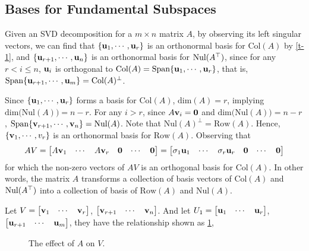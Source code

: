 \subsection{Bases for Fundamental Subspaces}
Given an SVD decomposition for a $m\times n$ matrix $A$, by observing its left singular vectors, we can find that $\{\mathbf{u}_1, \cdots, \mathbf{u}_r \}$ is an orthonormal basis for $\text{Col}(A)$ by \cref{t-1}, and $\{\mathbf{u}_{r+1}, \cdots, \mathbf{u}_n\}$ is an orthonormal basis for $\text{Nul}(A^{\top})$, since for any $r< i\leq n$, $\mathbf{u}_i$ is orthogonal to $\text{Col}(A) = \text{Span}\{\mathbf{u}_1, \cdots, \mathbf{u}_{r} \}$, that is, $\text{Span}\{\mathbf{u}_{r+1}, \cdots, \mathbf{u}_m \} = \text{Col}(A)^\perp$.\par
    Since $\{\mathbf{u}_1, \cdots, \mathbf{u}_r \}$ forms a basis for $\text{Col}(A)$, $\text{dim}(A) = r$, implying $\text{dim}\Big(\text{Nul}(A) \Big) = n - r$. For any $i > r$, since $A\mathbf{v}_i = \mathbf{0}$ and $\text{dim}\Big(\text{Nul}(A) \Big) = n - r$, $\text{Span}\{\mathbf{v}_{r+1}, \cdots, \mathbf{v}_{n} \} = \text{Nul}(A)$. Note that $\text{Nul}(A)^\perp = \text{Row}(A)$. Hence, $\{\mathbf{v}_1,\cdots, v_r \}$ is an orthonormal basis for $\text{Row}(A)$. Observing that
    \begin{equation*}
        AV = \begin{bmatrix}
                A\mathbf{v}_1 & \cdots & A\mathbf{v}_r & \mathbf{0} & \cdots & \mathbf{0} 
            \end{bmatrix} = \begin{bmatrix}
                    \sigma_1\mathbf{u}_1 & \cdots & \sigma_r\mathbf{u}_r & \mathbf{0} & \cdots & \mathbf{0}
                \end{bmatrix}
    \end{equation*} for which the non-zero vectors of $AV$ is an orthogonal basis for $\text{Col}(A)$. In other words, the matrix $A$ transforms a collection of basis vectors of $\text{Col}(A)$ and $\text{Nul}(A^{\top})$ into a collection of basis of $\text{Row}(A)$ and $\text{Nul}(A)$. 
    
    Let $V = \begin{bmatrix}
        \mathbf{v}_1 & \cdots & \mathbf{v}_r
    \end{bmatrix}$, $\begin{bmatrix}
        \mathbf{v}_{r+1} & \cdots & \mathbf{v}_{n}
    \end{bmatrix}$. And let $U_1 = \begin{bmatrix}
        \mathbf{u}_1 & \cdots & \mathbf{u}_r
    \end{bmatrix}$, $\begin{bmatrix}
        \mathbf{u}_{r+1} & \cdots & \mathbf{u}_{m}
    \end{bmatrix}$, they have the relationship shown as \cref{SVD-relation},
    \begin{figure}
        \centering
        
        \caption{The effect of $A$ on $V$.}
        \label{SVD-relation}
    \end{figure}